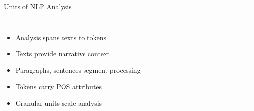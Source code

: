 \documentclass[aspectratio=169]{beamer}
\newcommand{\TitleFont}{\rmfamily}
\begin{document}
\begin{frame}[t]{}
  \vspace*{0.5cm}
  {\TitleFont\fontsize{18}{22}\selectfont\color{LUBronze}Units of NLP Analysis\par}
  \vspace{0.3em}
  {\color{LUBronze}\rule{\linewidth}{0.8pt}}\par
  \vspace{0.2cm}
  \begin{columns}[t]
    \begin{column}[t]{0.45\textwidth}
      \vspace*{0pt}
      \begin{itemize}\setlength\itemsep{0.65em}
        \item Analysis spans texts to tokens
        \item Texts provide narrative context
        \item Paragraphs, sentences segment processing
        \item Tokens carry POS attributes
        \item Granular units scale analysis
      \end{itemize}
    \end{column}
  \end{columns}
\end{frame}
\end{document}
